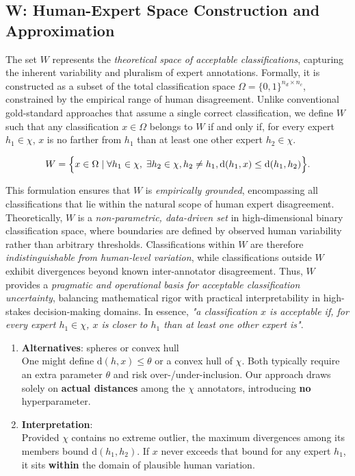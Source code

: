 \documentclass[12pt]{article}
\begin{document}
\subsection{W: Human-Expert Space Construction and Approximation}\label{sec:Wconstruction}

The set \( W \) represents the \textit{theoretical space of acceptable classifications}, capturing the inherent variability and pluralism of expert annotations. Formally, it is constructed as a subset of the total classification space \( \Omega = \{0,1\}^{n_d \times n_c} \), constrained by the empirical range of human disagreement. Unlike conventional gold-standard approaches that assume a single correct classification, we define \( W \) such that any classification \( x \in \Omega \) belongs to \( W \) if and only if, for every expert \( h_1 \in \chi \), $x$ is no farther from $h_1$ than at least one other expert \( h_2 \in \chi \).

\begin{equation}
W = \Bigl\{ x \in \Omega \mid \forall h_1 \in \chi, \; \exists h_2 \in \chi, h_2 \neq h_1 , \mathrm{d}(h_1, x) \leq \mathrm{d}(h_1, h_2) \Bigr\}.
\end{equation}

This formulation ensures that \( W \) is \textit{empirically grounded}, encompassing all classifications that lie within the natural scope of human expert disagreement. Theoretically, \( W \) is a \textit{non-parametric, data-driven set} in high-dimensional binary classification space, where boundaries are defined by observed human variability rather than arbitrary thresholds. Classifications within \( W \) are therefore \textit{indistinguishable from human-level variation}, while classifications outside \( W \) exhibit divergences beyond known inter-annotator disagreement. Thus, \( W \) provides a \textit{pragmatic and operational basis for acceptable classification uncertainty}, balancing mathematical rigor with practical interpretability in high-stakes decision-making domains. In essence, \emph{"a classification $x$ is acceptable if, for every expert $h_1\in\chi$, $x$ is closer to $h_1$ than at least one other expert is"}.

\begin{enumerate}
\item \textbf{Alternatives}: spheres or convex hull\\
   One might define $\mathrm{d}(h,x)\le\theta$ or a convex hull of $\chi$. Both typically require an extra parameter $\theta$ and risk over-/under-inclusion. Our approach draws solely on \textbf{actual distances} among the $\chi$ annotators, introducing \textbf{no} hyperparameter.
\item \textbf{Interpretation}:\\
   Provided $\chi$ contains no extreme outlier, the maximum divergences among its members bound $\mathrm{d}(h_1,h_2)$. If $x$ never exceeds that bound for any expert $h_1$, it sits \textbf{within} the domain of plausible human variation.
\end{enumerate}
\end{document}
